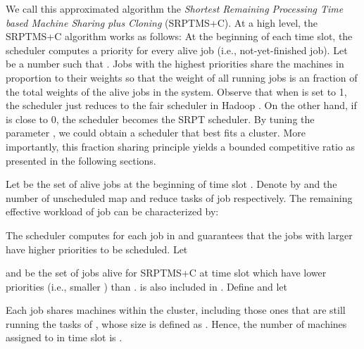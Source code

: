 \documentclass[10pt,conference,compsocconf,letterpaper]{IEEEtran}
\begin{document}
We call this approximated algorithm the \textit{Shortest Remaining Processing Time based Machine Sharing plus Cloning} (SRPTMS+C).
At a high level, the SRPTMS+C algorithm works as follows: At the beginning of each time slot, the scheduler computes a priority for every alive job (i.e., not-yet-finished job). Let  be a number such that .  Jobs with the highest priorities share the machines in proportion to their weights so that the weight of all running jobs is an  fraction of the total weights of  the alive jobs in the system. Observe that when  is set to 1, the scheduler just reduces to the fair scheduler in  Hadoop \cite{hadoop}. On the other hand,  if  is close to 0, the scheduler becomes the SRPT scheduler. By tuning the parameter , we could obtain a scheduler
that best fits a cluster.  More importantly, this  fraction sharing principle yields a bounded competitive ratio as presented in the following sections.


Let  be the set of alive jobs at the beginning of time slot . Denote by  and  the number of unscheduled map and reduce tasks of job  respectively. The remaining effective workload of job  can be characterized by:

The scheduler computes  for each job in  and guarantees that the jobs with larger  have higher priorities to be scheduled. Let

and  be the set of jobs alive for SRPTMS+C at time slot  which have lower priorities (i.e., smaller ) than .  is also included in . Define 
and let
 

Each job  shares  machines within the cluster, including those ones that are still running the tasks of , whose size is defined as . Hence, the number of machines assigned  to  in time slot  is .
\end{document}
